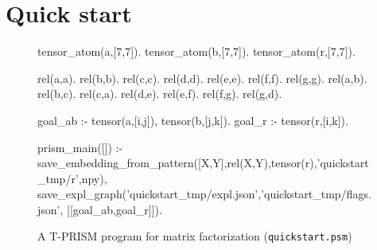 \documentclass[a4paper]{report}
\begin{document}
\section{Quick start}
\label{sec:quickstart}

\begin{figure}[tb]
\begin{prologcode}[numbers=left]
tensor_atom(a,[7,7]).
tensor_atom(b,[7,7]).
tensor_atom(r,[7,7]).

rel(a,a). rel(b,b). rel(c,c). rel(d,d). rel(e,e). rel(f,f). rel(g,g).
rel(a,b). rel(b,c). rel(c,a).
rel(d,e). rel(e,f). rel(f,g). rel(g,d).

goal_ab :- tensor(a,[i,j]), tensor(b,[j,k]).  %
goal_r  :- tensor(r,[i,k]).                    %

prism_main([]) :-
    save_embedding_from_pattern([X,Y],rel(X,Y),tensor(r),'quickstart_tmp/r',npy),
    save_expl_graph('quickstart_tmp/expl.json','quickstart_tmp/flags.json',
                    [[goal_ab,goal_r]]).
\end{prologcode}
\caption{A T-PRISM program for matrix factorization ({\tt quickstart.psm})}
\label{fig:quickstart}
\end{figure}
\end{document}
